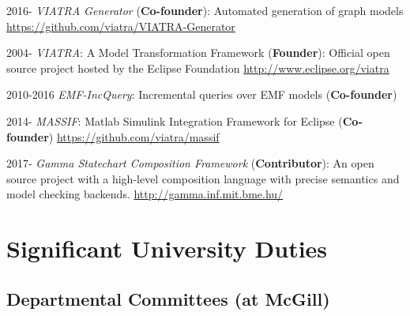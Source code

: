 \begin{yearlist}
\item[2016-] \emph{VIATRA Generator} (\textbf{Co-founder}): Automated generation of graph models \newline \url{https://github.com/viatra/VIATRA-Generator} 

\item[2004-] \emph{VIATRA}: A Model Transformation Framework (\textbf{Founder}): Official open source project hosted by the Eclipse Foundation \newline \url{http://www.eclipse.org/viatra} 

\item[2010-2016] \emph{EMF-IncQuery}: Incremental queries over EMF models (\textbf{Co-founder}) 

\item[2014-] \emph{MASSIF}: Matlab Simulink Integration Framework for Eclipse (\textbf{Co-founder}) \newline 
\url{https://github.com/viatra/massif} 

\item[2017-] \emph{Gamma Statechart Composition Framework} (\textbf{Contributor}): An open source project with a high-level composition language with precise semantics and model checking backends. \newline \url{http://gamma.inf.mit.bme.hu/} 

\end{yearlist}


\section{Significant University Duties}

\subsection{Departmental Committees (at McGill)}

